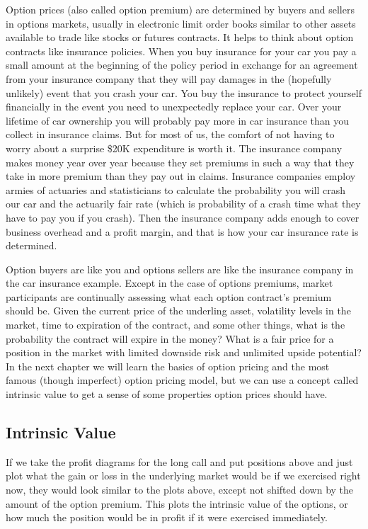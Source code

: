 \documentclass[
  letterpaper,
  DIV=11,
  numbers=noendperiod]{scrreprt}
\begin{document}
Option prices (also called option premium) are determined by buyers and
sellers in options markets, usually in electronic limit order books
similar to other assets available to trade like stocks or futures
contracts. It helps to think about option contracts like insurance
policies. When you buy insurance for your car you pay a small amount at
the beginning of the policy period in exchange for an agreement from
your insurance company that they will pay damages in the (hopefully
unlikely) event that you crash your car. You buy the insurance to
protect yourself financially in the event you need to unexpectedly
replace your car. Over your lifetime of car ownership you will probably
pay more in car insurance than you collect in insurance claims. But for
most of us, the comfort of not having to worry about a surprise \$20K
expenditure is worth it. The insurance company makes money year over
year because they set premiums in such a way that they take in more
premium than they pay out in claims. Insurance companies employ armies
of actuaries and statisticians to calculate the probability you will
crash our car and the actuarily fair rate (which is probability of a
crash time what they have to pay you if you crash). Then the insurance
company adds enough to cover business overhead and a profit margin, and
that is how your car insurance rate is determined.

Option buyers are like you and options sellers are like the insurance
company in the car insurance example. Except in the case of options
premiums, market participants are continually assessing what each option
contract's premium should be. Given the current price of the underling
asset, volatility levels in the market, time to expiration of the
contract, and some other things, what is the probability the contract
will expire in the money? What is a fair price for a position in the
market with limited downside risk and unlimited upside potential? In the
next chapter we will learn the basics of option pricing and the most
famous (though imperfect) option pricing model, but we can use a concept
called intrinsic value to get a sense of some properties option prices
should have.

\hypertarget{intrinsic-value}{%
\subsection{Intrinsic Value}\label{intrinsic-value}}

If we take the profit diagrams for the long call and put positions above
and just plot what the gain or loss in the underlying market would be if
we exercised right now, they would look similar to the plots above,
except not shifted down by the amount of the option premium. This plots
the intrinsic value of the options, or how much the position would be in
profit if it were exercised immediately.
\end{document}
